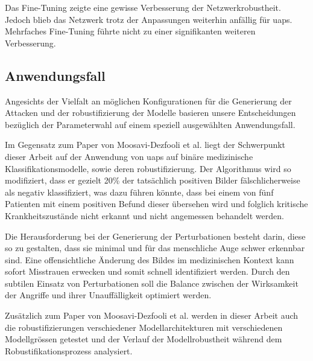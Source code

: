 Das Fine-Tuning zeigte eine gewisse Verbesserung der Netzwerkrobustheit. Jedoch blieb das Netzwerk trotz der Anpassungen weiterhin anfällig für \acrshort{uap}s. Mehrfaches Fine-Tuning führte nicht zu einer signifikanten weiteren Verbesserung.

\newpage

\subsection{Anwendungsfall} 
Angesichts der Vielfalt an möglichen Konfigurationen für die Generierung der Attacken und der \Gls{robustifizierung} der Modelle basieren unsere Entscheidungen bezüglich der Parameterwahl auf einem speziell ausgewählten Anwendungsfall. 

Im Gegensatz zum Paper von Moosavi-Dezfooli et al. \cite{moosavi-dezfooli_universal_2017} liegt der Schwerpunkt dieser Arbeit auf der Anwendung von \acrlong{uap}s auf binäre medizinische Klassifikationsmodelle, sowie deren \Gls{robustifizierung}. Der Algorithmus wird so modifiziert, dass er gezielt 20\% der tatsächlich positiven Bilder fälschlicherweise als negativ klassifiziert, was dazu führen könnte, dass bei einem von fünf Patienten mit einem positiven Befund dieser übersehen wird und folglich kritische Krankheitszustände nicht erkannt und nicht angemessen behandelt werden.

Die Herausforderung bei der Generierung der Perturbationen besteht darin, diese so zu gestalten, dass sie minimal und für das menschliche Auge schwer erkennbar sind. Eine offensichtliche Änderung des Bildes im medizinischen Kontext kann sofort Misstrauen erwecken und somit schnell identifiziert werden. Durch den subtilen Einsatz von Perturbationen soll die Balance zwischen der Wirksamkeit der Angriffe und ihrer Unauffälligkeit optimiert werden. 

Zusätzlich zum Paper von Moosavi-Dezfooli et al. \cite{moosavi-dezfooli_universal_2017} werden in dieser Arbeit auch die \Gls{robustifizierung}en verschiedener Modellarchitekturen mit verschiedenen Modellgrössen getestet und der Verlauf der Modellrobustheit während dem Robustifikationsprozess analysiert.